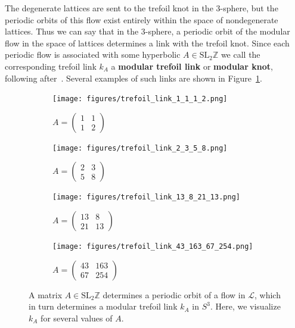 \documentclass[12pt,twoside]{reedthesis}
\theoremstyle{definition}
\newcommand{\Z}{\mathbb{Z}}
\newcommand{\LS}{\mathcal{L}}
\newcommand{\SLZ}{\mathrm{SL}_2{\Z}}
\newcommand{\defnphrase}[1]{\textbf{#1}}
\begin{document}
The degenerate lattices are sent to the trefoil knot in the 3-sphere, but the periodic orbits of this flow exist entirely within the space of nondegenerate lattices.
Thus we can say that in the 3-sphere, a periodic orbit of the modular flow in the space of lattices determines a link with the trefoil knot.
Since each periodic flow is associated with some hyperbolic $A \in \SLZ$ we call the corresponding trefoil link $k_A$ a \defnphrase{modular trefoil link} or \defnphrase{modular knot}, following after~\cite{ghys2007}.
Several examples of such links are shown in Figure~\ref{fig:trefoil_links}.

\begin{figure}[h!]
  \centering
  \begin{subfigure}[t]{0.48\textwidth}
    \centering
    \texttt{[image: figures/trefoil\_link\_1\_1\_1\_2.png]}
    \caption*{$A = \begin{pmatrix}1 & 1 \\ 1 & 2\end{pmatrix}$}
  \end{subfigure}
  \hfill
  \begin{subfigure}[t]{0.48\textwidth}
    \centering
    \texttt{[image: figures/trefoil\_link\_2\_3\_5\_8.png]}
    \caption*{$A = \begin{pmatrix}2 & 3 \\ 5 & 8\end{pmatrix}$}
  \end{subfigure}
  \begin{subfigure}[t]{0.48\textwidth}
    \centering
    \texttt{[image: figures/trefoil\_link\_13\_8\_21\_13.png]}
    \caption*{$A = \begin{pmatrix}13 & 8 \\ 21 & 13\end{pmatrix}$}
  \end{subfigure}
  \hfill
  \begin{subfigure}[t]{0.48\textwidth}
    \centering
    \texttt{[image: figures/trefoil\_link\_43\_163\_67\_254.png]}
    \caption*{$A = \begin{pmatrix}43 & 163\\ 67 & 254\end{pmatrix}$}
  \end{subfigure}
  \caption{A matrix $A \in \SLZ$ determines a periodic orbit of a flow in $\LS$, which in turn determines a modular trefoil link $k_A$ in $S^3$. Here, we visualize $k_A$ for several values of $A$.}
  \label{fig:trefoil_links}
\end{figure}
\end{document}
